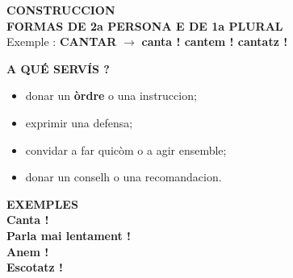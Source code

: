 \documentclass[a4paper,11pt]{article}
\begin{document}
\noindent\hspace*{6mm}\begin{minipage}{.91\textwidth}
\begin{neutralbox}\textbf{\color{NeutralDark}CONSTRUCCION}\\[1mm]\centering
{\Large\textbf{FORMAS DE 2a PERSONA E DE 1a PLURAL}}\\[1mm]
\small Exemple : \textbf{CANTAR} $\rightarrow$ \textbf{canta ! \quad cantem ! \quad cantatz !}
\end{neutralbox}
\vspace{2.5mm}\begin{center}\end{center}
\vspace{1.5mm}\begin{neutralbox}\textbf{\color{NeutralDark}A QUÉ SERVÍS ?}\\[1mm]
\begin{itemize}\setlength{\itemsep}{.4mm}
\item donar un \textbf{òrdre} o una instruccion;
\item exprimir una defensa;
\item convidar a far quicòm o a agir ensemble;
\item donar un conselh o una recomandacion.
\end{itemize}\end{neutralbox}
\vspace{2mm}\begin{neutralbox}\textbf{\color{NeutralDark}EXEMPLES}\\[1mm]
\textbf{Canta !}\\
\textbf{Parla mai lentament !}\\
\textbf{Anem !}\\
\textbf{Escotatz !}
\end{neutralbox}
\vspace{2mm}
\begin{minipage}{.485\textwidth}\begin{neutralbox}[height=3.15cm]

\end{neutralbox}
\end{minipage}
\end{minipage}
\end{document}
